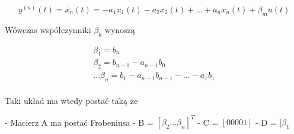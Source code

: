 \documentclass{article}
\begin{document}
	\begin{equation}
		y^{(n)}(t) = \dot{x_{n}}(t) = -a_{1}x_{1}(t) - a_{2}x_{2}(t) + ... + a_{n}x_{n}(t) + \beta_{m}u(t) 
	\end{equation}

	Wówczas współczynniki $\beta_{k}$ wynoszą

		\begin{align*}
			 \beta_{1} = b_{n} \\
			 \beta_{2} = b_{n-1} - a_{n-1}b_{0}\\
			...
			 \beta_{n} = b_{1} - a_{n-1}b_{n-1} - ... - a_{1}b_{1}\\
		\end{align*}

	Taki układ ma wtedy postać taką że

	- Macierz A ma postać Frobeniusa
	- B = $[\beta_{2} ... \beta_{n}]^{T}$
	- C = $[0 0 0 0 1]$
	- D = $[\beta_{1}$
\end{document}
